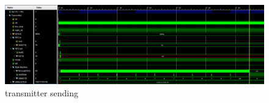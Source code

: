 \begin{figure}[h]
\vspace{0.5cm}
\begin{center}
\includegraphics[width=\textwidth]{figures/sim5.png}
\caption{transmitter sending}
\label{fig:sim5}
\end{center}
\vspace{0.5cm}
\end{figure}